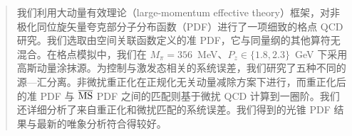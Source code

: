 \documentclass[11pt]{ctexart}
\begin{document}
\begin{abstract}
我们利用大动量有效理论（large-momentum effective theory）框架，对非极化同位旋矢量夸克部分子分布函数（PDF）进行了一项细致的格点 QCD 研究。我们选取由空间关联函数定义的准 PDF，它与同量纲的其他算符无混合。在格点模拟中，我们在 $M_\pi=356$~MeV、$P_z \in \{1.8,2.3\}$~GeV 下采用高斯动量涂抹源。为控制与激发态相关的系统误差，我们研究了五种不同的源—汇分离。非微扰重正化在正规化无关动量减除方案下进行，而重正化后的准 PDF 与 $\overline{\rm MS}$ PDF 之间的匹配则基于微扰 QCD 计算到一圈阶。我们还详细分析了来自重正化和微扰匹配的系统误差。我们得到的光锥 PDF 结果与最新的唯象分析符合得较好。
\end{abstract}







\end{document}
